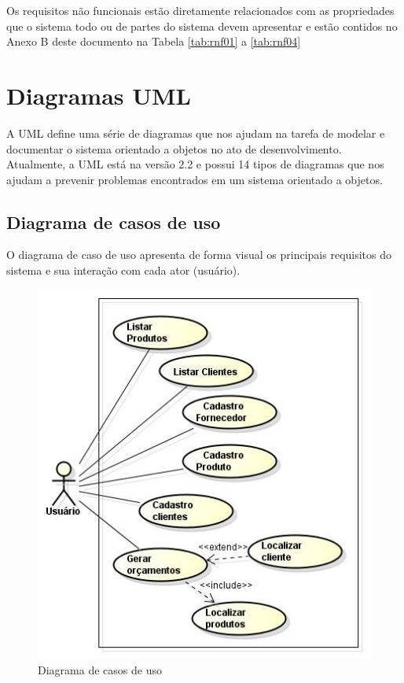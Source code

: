 Os requisitos não funcionais estão diretamente relacionados com as propriedades que o sistema todo ou de partes do sistema devem apresentar e estão contidos no Anexo B deste documento na Tabela \ref{tab:rnf01} a \ref{tab:rnf04}


\section{Diagramas UML}

A UML define uma série de diagramas que nos ajudam na tarefa de modelar e documentar o sistema orientado a objetos no ato de desenvolvimento. Atualmente, a UML está na versão 2.2 e possui 14 tipos de diagramas que nos ajudam a prevenir problemas encontrados em um sistema orientado a objetos. 

\subsection{Diagrama de casos de uso}
O diagrama de caso de uso apresenta de forma visual os principais requisitos do sistema e sua interação com cada ator (usuário).

\begin{figure}[htp]
\centering
\caption{Diagrama de casos de uso}
\label{fig:Casodeuso}
\includegraphics[width=13cm]{imagens/diagramas/Caso-de-uso-}
\end{figure}

